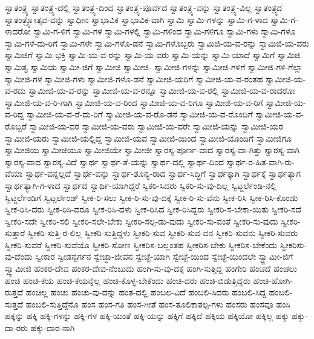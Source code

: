 {ಸ್ವಾತಂತ್ರ್ಯ
ಸ್ವಾತಂತ್ರ್ಯ-ದಲ್ಲಿ
ಸ್ವಾತಂತ್ರ್ಯ-ದಿಂದ
ಸ್ವಾತಂತ್ರ್ಯ-ಪೂರ್ವದ
ಸ್ವಾತಂತ್ರ್ಯ-ವನ್ನು
ಸ್ವಾತಂತ್ರ್ಯ-ವಿಲ್ಲ
ಸ್ವಾತಂತ್ರ್ಯದ
ಸ್ವಾತಂತ್ರ್ಯೋತ್ಸವ-ವನ್ನು
ಸ್ವಾಧೀನ
ಸ್ವಾಭಾವಿಕ
ಸ್ವಾಭಾವಿಕ-ವಾಗಿ
ಸ್ವಾಮಿ
ಸ್ವಾಮಿ-ಗಳನ್ನು
ಸ್ವಾಮಿ-ಗ-ಳಾದ
ಸ್ವಾಮಿ-ಗ-ಳಾದರೋ
ಸ್ವಾಮಿ-ಗ-ಳಿಗೆ
ಸ್ವಾಮಿ-ಗಳ
ಸ್ವಾಮಿ-ಗಳಲ್ಲಿ
ಸ್ವಾಮಿ-ಗಳಿಂದ
ಸ್ವಾಮಿ-ಗಳಿಗೂ
ಸ್ವಾಮಿ-ಗಳು
ಸ್ವಾಮಿ-ಗಳೂ
ಸ್ವಾಮಿ-ಗಳೆ-ದು-ರಿಗೆ
ಸ್ವಾಮಿ-ಗಳೇ
ಸ್ವಾಮಿ-ಗಳೊ-ಡನೆ
ಸ್ವಾಮಿ-ಗಳೊಬ್ಬರು
ಸ್ವಾಮಿಜಿ-ಯ-ವ-ರನ್ನು
ಸ್ವಾಮಿಜಿ-ಯ-ವರು
ಸ್ವಾಮಿಜಿಗೆ
ಸ್ವಾಮಿ-ಭಕ್ತಿ
ಸ್ವಾಮಿ-ಯ-ವ-ರನ್ನು
ಸ್ವಾಮಿ-ಯ-ವರು
ಸ್ವಾಮಿ-ಯನ್ನು
ಸ್ವಾಮಿ-ಯಾದೆ
ಸ್ವಾಮಿಗೆ
ಸ್ವಾಮಿಜಿ
ಸ್ವಾಮಿತ್ವ
ಸ್ವಾಮಿಯ
ಸ್ವಾಮೀ-ಜಿಗೆ
ಸ್ವಾಮೀಜಿ
ಸ್ವಾಮೀಜಿ-
ಸ್ವಾಮೀಜಿ-ಗಳನ್ನು
ಸ್ವಾಮೀಜಿ-ಗಳಿಗೆ
ಸ್ವಾಮೀಜಿ-ಗಳಿ-ಗೆಲ್ಲಾ
ಸ್ವಾಮೀಜಿ-ಗಳ
ಸ್ವಾಮೀಜಿ-ಗಳು
ಸ್ವಾಮೀಜಿ-ಗಳೊ-ಡನೆ
ಸ್ವಾಮೀಜಿ-ಯರಿಗೆ
ಸ್ವಾಮೀಜಿ-ಯ-ವ-ರಂತಹ
ಸ್ವಾಮೀಜಿ-ಯ-ವ-ರದು
ಸ್ವಾಮೀಜಿ-ಯ-ವ-ರನ್ನು
ಸ್ವಾಮೀಜಿ-ಯ-ವ-ರನ್ನೂ
ಸ್ವಾಮೀಜಿ-ಯ-ವ-ರಲ್ಲಿ
ಸ್ವಾಮೀಜಿ-ಯ-ವ-ರಾದರೋ
ಸ್ವಾಮೀಜಿ-ಯ-ವ-ರಿ-ಗಾಗಿ
ಸ್ವಾಮೀಜಿ-ಯ-ವ-ರಿಂದ
ಸ್ವಾಮೀಜಿ-ಯ-ವ-ರಿಗೂ
ಸ್ವಾಮೀಜಿ-ಯ-ವ-ರಿಗೆ
ಸ್ವಾಮೀಜಿ-ಯ-ವ-ರಿದ್ದ
ಸ್ವಾಮೀಜಿ-ಯ-ವ-ರೆ-ದು-ರಿಗೆ
ಸ್ವಾಮೀಜಿ-ಯ-ವ-ರೊ-ಡನೆ
ಸ್ವಾಮೀಜಿ-ಯ-ವ-ರೊಂದಿಗೆ
ಸ್ವಾಮೀಜಿ-ಯ-ವ-ರೊಬ್ಬರೆ
ಸ್ವಾಮೀಜಿ-ಯ-ವರ
ಸ್ವಾಮೀಜಿ-ಯ-ವರು
ಸ್ವಾಮೀಜಿ-ಯ-ವರೇ
ಸ್ವಾಮೀಜಿ-ಯನ್ನು
ಸ್ವಾಮೀಜಿ-ಯರ
ಸ್ವಾಮೀಜಿ-ಯರು
ಸ್ವಾಮೀಜಿ-ಯಲ್ಲಿದ್ದ
ಸ್ವಾಮೀಜಿ-ಯವ
ಸ್ವಾಮೀಜಿ-ಯಿಂದ
ಸ್ವಾಮೀಜಿ-ಯೊಂದಿಗೆ
ಸ್ವಾಮೀಜಿಗೂ
ಸ್ವಾಮೀಜಿಯ
ಸ್ವಾಮೀಜಿಯೂ
ಸ್ವಾಮೀಜಿಯೇ
ಸ್ವಾಮೀಜೀ
ಸ್ವಾರಸ್ಯ-ಪೂರ್ಣ-ವಾದ
ಸ್ವಾರಸ್ಯ-ವಾ-ಗಿತ್ತು
ಸ್ವಾರಸ್ಯ-ವಾಗಿ
ಸ್ವಾರಸ್ಯ-ವಾದ
ಸ್ವಾರಸ್ಯ-ವಿದೆ
ಸ್ವಾರ್ಥ
ಸ್ವಾರ್ಥ-ತೆ-ಯನ್ನು
ಸ್ವಾರ್ಥ-ದಲ್ಲಿ
ಸ್ವಾರ್ಥ-ದಿಂದ
ಸ್ವಾರ್ಥ-ರ-ಹಿತ-ವಾಗಿ-ರು-ವೆಯಾ
ಸ್ವಾರ್ಥ-ವನ್ನಲ್ಲದೆ
ಸ್ವಾರ್ಥ-ವನ್ನು
ಸ್ವಾರ್ಥ-ಶೂನ್ಯ-ರಾದ
ಸ್ವಾರ್ಥ-ಸಿದ್ಧಿಗೆ
ಸ್ವಾರ್ಥಕ್ಕಾಗಿ
ಸ್ವಾರ್ಥಕ್ಕೆ
ಸ್ವಾರ್ಥತ್ಯಾಗ
ಸ್ವಾರ್ಥತ್ಯಾಗಿ-ಗ-ಳಾದ
ಸ್ವಾರ್ಥದ
ಸ್ವಾರ್ಥಿ-ಯಾಗಿದ್ದರೆ
ಸ್ವಿಕರಿ-ಸಿದರು
ಸ್ವಿಕರಿ-ಸು-ವು-ದಿಲ್ಲ
ಸ್ವಿಟ್ಜರ್ಲೆಂಡಿ-ನಲ್ಲಿ
ಸ್ವಿಟ್ಜರ್ಲೆಂಡಿಗೆ
ಸ್ವಿಟ್ಸರ್ಲೆಂಡ್
ಸ್ವೀಕ-ರಿ-ಸಲು
ಸ್ವೀಕ-ರಿ-ಸು-ವು-ದಕ್ಕೆ
ಸ್ವೀಕ-ರಿ-ಸು-ವೆನು
ಸ್ವೀಕ-ರಿಸಿ
ಸ್ವೀಕ-ರಿಸಿ-ಕೊಂಡು
ಸ್ವೀಕ-ರಿಸಿ-ದರು
ಸ್ವೀಕ-ರಿಸಿ-ದರೂ
ಸ್ವೀಕ-ರಿಸಿ-ದಳು
ಸ್ವೀಕ-ರಿಸಿದ
ಸ್ವೀಕ-ರಿಸಿದ್ದರು
ಸ್ವೀಕರಿ-ಸ-ಬೇಕಾ-ಯಿತು
ಸ್ವೀಕರಿ-ಸದೆ
ಸ್ವೀಕರಿ-ಸದೇ
ಸ್ವೀಕರಿ-ಸಲಿ
ಸ್ವೀಕರಿ-ಸಲೇ-ಬೇಕು
ಸ್ವೀಕರಿ-ಸಲ್ಪ-ಡು-ವುದು
ಸ್ವೀಕರಿ-ಸು-ವಂತೆ
ಸ್ವೀಕರಿ-ಸು-ವುದು
ಸ್ವೀಕರಿ-ಸುತ್ತಾರೆ
ಸ್ವೀಕರಿ-ಸುತ್ತಿ-ರ-ಲಿಲ್ಲ
ಸ್ವೀಕರಿ-ಸುತ್ತಿದ್ದಳು
ಸ್ವೀಕರಿ-ಸುವ
ಸ್ವೀಕರಿ-ಸುವ-ವನ
ಸ್ವೀಕರಿ-ಸುವನು
ಸ್ವೀಕರಿ-ಸುವರು
ಸ್ವೀಕರಿ-ಸುವರೆ
ಸ್ವೀಕರಿ-ಸುವೆಯೊ
ಸ್ವೀಕರಿ-ಸೋಣ
ಸ್ವೀಕರಿಸ-ಬಲ್ಲಂತಹ
ಸ್ವೀಕರಿಸ-ಬೇಕು
ಸ್ವೀಕರಿಸ-ಬೇಕೆಂದು
ಸ್ವೀಕರಿಸು-ವು-ದೆಂದು
ಸ್ವೀಕಾರ
ಸ್ವೀಡನ್ಬರ್ಗನ
ಸ್ವೇಚ್ಛಾ-ಜೀವನ
ಸ್ವೇಚ್ಛೆ-ಯಾಗಿ
ಸ್ವೇಚ್ಛೆ-ಯಿಂದ
ಸ್ವೇಚ್ಛೆ-ಯಿಂದಲೇ
ಸ್ವ್ಬಾಮೀ-ಜಿಗೆ
ಸ್ವ್ವಾಮೀಜಿ
ಹಂಕರ-ದೇವ
ಹಂಕರ-ದೇವ-ನೆಂಬುದು
ಹಂಗಿ-ಸು-ವು-ದಕ್ಕೆ
ಹಂಗಿ-ಸುತ್ತಿದ್ದ
ಹಂಗೇರಿ
ಹಂಚದೆ
ಹಂಚಲು
ಹಂಚಿ
ಹಂಚಿ-ಕೆಯ
ಹಂಚಿ-ಕೆಯನ್ನೆಲ್ಲ
ಹಂಚಿ-ಕೊಳ್ಳ-ಬೇಕೆಂದು
ಹಂಚಿ-ದರು
ಹಂಚಿ-ಬಿಡುತ್ತಿದ್ದರು
ಹಂಚಿ-ಹೋಗಿ-ರುತ್ತದೆ
ಹಂಚಿಲ್ಲ
ಹಂಚು
ಹಂಚು-ವು-ದನ್ನು
ಹಂತ-ದಲ್ಲಿ
ಹಂಬಲ-ವಿದೆ
ಹಂಬಲಿ-ಸಿದರು
ಹಂಬಲಿ-ಸಿದ್ದ
ಹಂಬಲಿ-ಸುತ್ತದೆ
ಹಂಬಲಿ-ಸುತ್ತಿದ್ದೆನೊ
ಹಂಸ
ಹಂಸ-ಗತಿ
ಹಂಸ-ಗೀತೆ
ಹಂಸ-ತೂಲಿಕಾತಲ್ಪ-ಗಳು
ಹಂಸರು
ಹಂಸವೂ
ಹಂಸಿ
ಹಕ್ಕನ್ನು
ಹಕ್ಕಿ
ಹಕ್ಕಿ-ಗಳನ್ನು
ಹಕ್ಕಿ-ಗಳ
ಹಕ್ಕಿ-ಯಂತೆ
ಹಕ್ಕಿ-ಯನ್ನು
ಹಕ್ಕಿಗೆ
ಹಕ್ಕಿದೆ
ಹಕ್ಕಿಯ
ಹಕ್ಕಿಯೋ
ಹಕ್ಕಿಲ್ಲ
ಹಕ್ಕು
ಹಕ್ಕು-ದಾ-ರರು
ಹಕ್ಕು-ದಾರ-ನಾಗಿ
}
